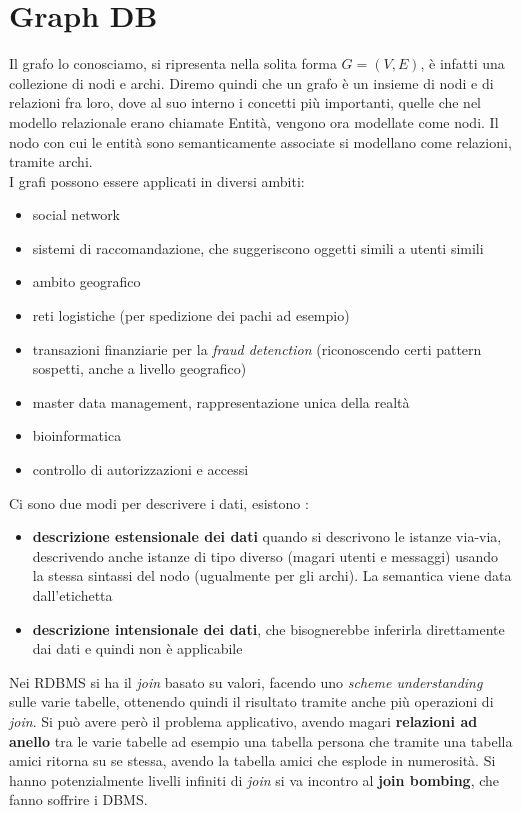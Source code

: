\section{Graph DB}
Il grafo lo conosciamo, si ripresenta nella solita forma $G = (V,E)$, è infatti una collezione di nodi e archi. Diremo quindi che un grafo è un insieme di nodi e di relazioni fra loro, dove al suo interno i concetti più importanti, quelle che nel modello relazionale erano chiamate Entità, vengono ora modellate come nodi. Il nodo con cui le entità sono semanticamente associate si modellano come relazioni, tramite archi. \\
I grafi possono essere applicati in diversi ambiti:
\begin{itemize}
  \item social network
  \item sistemi di raccomandazione, che suggeriscono oggetti simili a utenti simili
  \item ambito geografico
  \item reti logistiche (per spedizione dei pachi ad esempio)
  \item transazioni finanziarie per la \textit{fraud detenction} (riconoscendo certi pattern sospetti, anche a livello geografico)
  \item master data management, rappresentazione unica della realtà
  \item bioinformatica
  \item controllo di autorizzazioni e accessi
\end{itemize}
Ci sono due modi per descrivere i dati, esistono :
\begin{itemize}
  \item \textbf{descrizione estensionale dei dati} quando si descrivono le istanze via-via, descrivendo anche istanze di tipo diverso (magari utenti e messaggi) usando la stessa sintassi del nodo (ugualmente per gli archi). La semantica viene data dall'etichetta
  \item \textbf{descrizione intensionale dei dati}, che bisognerebbe inferirla  direttamente dai dati e quindi non è applicabile
\end{itemize}


Nei RDBMS si ha il \textit{join} basato su valori, facendo uno \textit{scheme understanding} sulle varie tabelle, ottenendo quindi il risultato tramite anche più operazioni di \textit{join}. Si può avere però il problema applicativo, avendo magari \textbf{relazioni ad anello} tra le varie tabelle ad esempio una tabella persona che tramite una tabella amici ritorna su se stessa, avendo la tabella amici che esplode in numerosità. Si hanno potenzialmente livelli infiniti di \textit{join} si va incontro al \textbf{join bombing}, che fanno soffrire i DBMS. 

